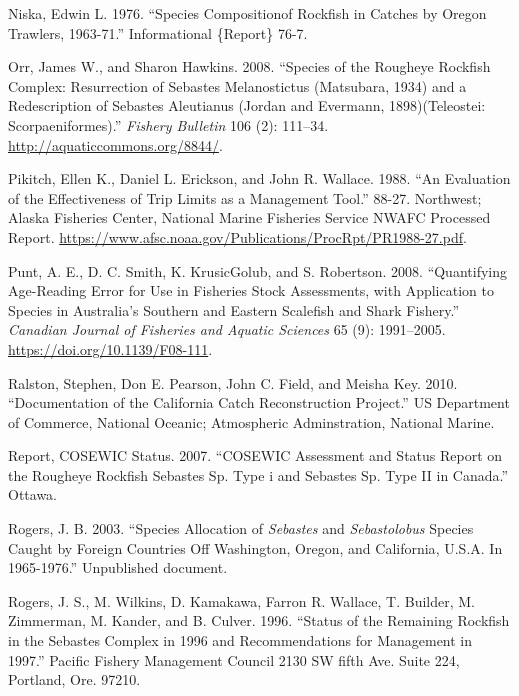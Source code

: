 \documentclass[
]{scrartcl}
\newlength{\cslhangindent}
\newenvironment{CSLReferences}[2] %
 {\begin{list}{}{%
  \setlength{\itemindent}{0pt}
  \setlength{\leftmargin}{0pt}
  \setlength{\parsep}{0pt}
  \ifodd #1
   \setlength{\leftmargin}{\cslhangindent}
   \setlength{\itemindent}{-1\cslhangindent}
  \fi
  \setlength{\itemsep}{#2\baselineskip}}}
 {\end{list}}
\begin{document}
\begin{CSLReferences}{1}{0}
Niska, Edwin L. 1976. {``Species {Compositionof} Rockfish in Catches by
{Oregon} {Trawlers}, 1963-71.''} Informational \{Report\} 76-7.

Orr, James W., and Sharon Hawkins. 2008. {``Species of the Rougheye
Rockfish Complex: Resurrection of {Sebastes} Melanostictus ({Matsubara},
1934) and a Redescription of {Sebastes} Aleutianus ({Jordan} and
{Evermann}, 1898)({Teleostei}: {Scorpaeniformes}).''} \emph{Fishery
Bulletin} 106 (2): 111--34. \url{http://aquaticcommons.org/8844/}.

Pikitch, Ellen K., Daniel L. Erickson, and John R. Wallace. 1988. {``An
Evaluation of the Effectiveness of Trip Limits as a Management Tool.''}
88-27. Northwest; Alaska Fisheries Center, National Marine Fisheries
Service NWAFC Processed Report.
\url{https://www.afsc.noaa.gov/Publications/ProcRpt/PR1988-27.pdf}.

Punt, A. E., D. C. Smith, K. KrusicGolub, and S. Robertson. 2008.
{``Quantifying Age-Reading Error for Use in Fisheries Stock Assessments,
with Application to Species in {A}ustralia's Southern and Eastern
Scalefish and Shark Fishery.''} \emph{Canadian Journal of Fisheries and
Aquatic Sciences} 65 (9): 1991--2005.
\url{https://doi.org/10.1139/F08-111}.

Ralston, Stephen, Don E. Pearson, John C. Field, and Meisha Key. 2010.
{``Documentation of the {California} Catch Reconstruction Project.''} US
Department of Commerce, National Oceanic; Atmospheric Adminstration,
National Marine.

Report, COSEWIC Status. 2007. {``COSEWIC Assessment and Status Report on
the Rougheye Rockfish Sebastes Sp. Type i and Sebastes Sp. Type II in
Canada.''} Ottawa.

Rogers, J. B. 2003. {``Species Allocation of \emph{Sebastes} and
\emph{Sebastolobus} Species Caught by Foreign Countries Off
{Washington}, {Oregon}, and {California}, {U}.{S}.{A}. In 1965-1976.''}
Unpublished document.

Rogers, J. S., M. Wilkins, D. Kamakawa, Farron R. Wallace, T. Builder,
M. Zimmerman, M. Kander, and B. Culver. 1996. {``Status of the
{Remaining} {Rockfish} in the {Sebastes} {Complex} in 1996 and
Recommendations for Management in 1997.''} Pacific Fishery Management
Council 2130 SW fifth Ave. Suite 224, Portland, Ore. 97210.


\end{CSLReferences}
\end{document}
